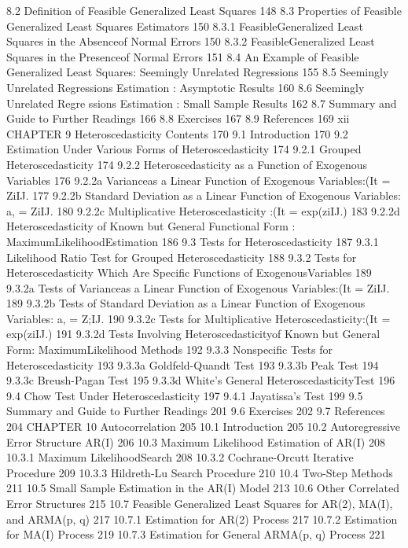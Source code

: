 {8.2 Definition of Feasible Generalized Least Squares 148
8.3 Properties of Feasible Generalized Least Squares Estimators 150
8.3.1 FeasibleGeneralized Least Squares in the Absenceof Normal Errors 150
8.3.2 FeasibleGeneralized Least Squares in the Presenceof Normal Errors 151
8.4 An Example of Feasible Generalized Least Squares: Seemingly Unrelated
Regressions 155
8.5 Seemingly Unrelated Regressions Estimation : Asymptotic Results 160
8.6 Seemingly Unrelated Regre ssions Estimation : Small Sample Results 162
8.7 Summary and Guide to Further Readings 166
8.8 Exercises 167
8.9 References 169
xii
CHAPTER 9
Heteroscedasticity
Contents
170
9.1 Introduction 170
9.2 Estimation Under Various Forms of Heteroscedasticity 174
9.2.1 Grouped Heteroscedasticity 174
9.2.2 Heteroscedasticity as a Function of Exogenous Variables 176
9.2.2a Varianceas a Linear Function of Exogenous Variables:(It = ZiIJ. 177
9.2.2b Standard Deviation as a Linear Function of Exogenous
Variables: a, = ZiIJ. 180
9.2.2c Multiplicative Heteroscedasticity :(It = exp(ziIJ.) 183
9.2.2d Heteroscedasticity of Known but General Functional Form :
MaximumLikelihoodEstimation 186
9.3 Tests for Heteroscedasticity 187
9.3.1 Likelihood Ratio Test for Grouped Heteroscedasticity 188
9.3.2 Tests for Heteroscedasticity Which Are Specific Functions of
ExogenousVariables 189
9.3.2a Tests of Varianceas a Linear Function of Exogenous
Variables:(It = ZiIJ. 189
9.3.2b Tests of Standard Deviation as a Linear Function of
Exogenous Variables: a, = Z;IJ. 190
9.3.2c Tests for Multiplicative Heteroscedasticity:(It = exp(ziIJ.) 191
9.3.2d Tests Involving Heteroscedasticityof Known but General
Form: MaximumLikelihood Methods 192
9.3.3 Nonspecific Tests for Heteroscedasticity 193
9.3.3a Goldfeld-Quandt Test 193
9.3.3b Peak Test 194
9.3.3c Breush-Pagan Test 195
9.3.3d White's General HeteroscedasticityTest 196
9.4 Chow Test Under Heteroscedasticity 197
9.4.1 Jayatissa's Test 199
9.5 Summary and Guide to Further Readings 201
9.6 Exercises 202
9.7 References 204
CHAPTER 10
Autocorrelation 205
10.1 Introduction 205
10.2 Autoregressive Error Structure AR(I) 206
10.3 Maximum Likelihood Estimation of AR(I) 208
10.3.1 Maximum LikelihoodSearch 208
10.3.2 Cochrane-Orcutt Iterative Procedure 209
10.3.3 Hildreth-Lu Search Procedure 210
10.4 Two-Step Methods 211
10.5 Small Sample Estimation in the AR(I) Model 213
10.6 Other Correlated Error Structures 215
10.7 Feasible Generalized Least Squares for AR(2), MA(I), and ARMA(p, q) 217
10.7.1 Estimation for AR(2) Process 217
10.7.2 Estimation for MA(I) Process 219
10.7.3 Estimation for General ARMA(p, q) Process 221
}
